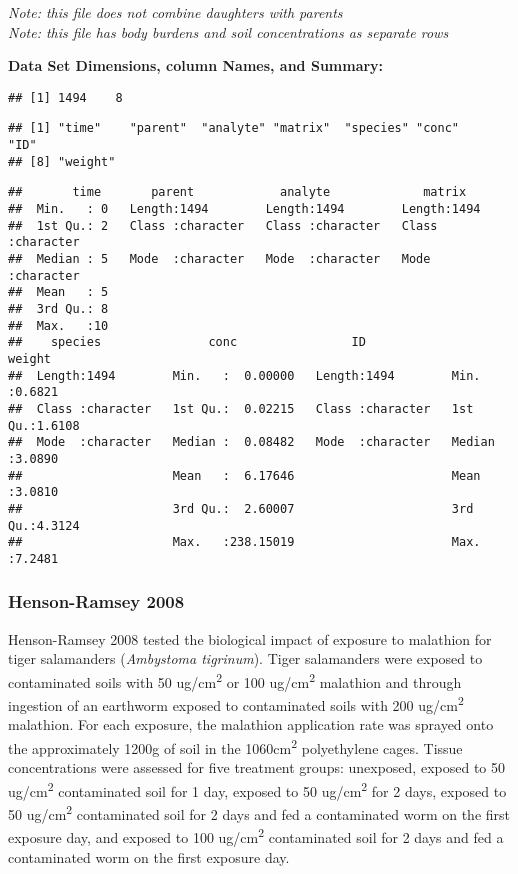 \documentclass[
]{article}
\begin{document}
\emph{Note: this file does not combine daughters with parents}\\
\emph{Note: this file has body burdens and soil concentrations as
separate rows}

\textbf{Data Set Dimensions, column Names, and Summary:}

\begin{verbatim}
## [1] 1494    8
\end{verbatim}

\begin{verbatim}
## [1] "time"    "parent"  "analyte" "matrix"  "species" "conc"    "ID"     
## [8] "weight"
\end{verbatim}

\begin{verbatim}
##       time       parent            analyte             matrix         
##  Min.   : 0   Length:1494        Length:1494        Length:1494       
##  1st Qu.: 2   Class :character   Class :character   Class :character  
##  Median : 5   Mode  :character   Mode  :character   Mode  :character  
##  Mean   : 5                                                           
##  3rd Qu.: 8                                                           
##  Max.   :10                                                           
##    species               conc                ID                weight      
##  Length:1494        Min.   :  0.00000   Length:1494        Min.   :0.6821  
##  Class :character   1st Qu.:  0.02215   Class :character   1st Qu.:1.6108  
##  Mode  :character   Median :  0.08482   Mode  :character   Median :3.0890  
##                     Mean   :  6.17646                      Mean   :3.0810  
##                     3rd Qu.:  2.60007                      3rd Qu.:4.3124  
##                     Max.   :238.15019                      Max.   :7.2481
\end{verbatim}

\hypertarget{henson-ramsey-2008}{%
\subsubsection{Henson-Ramsey 2008}\label{henson-ramsey-2008}}

Henson-Ramsey 2008 tested the biological impact of exposure to malathion
for tiger salamanders (\emph{Ambystoma tigrinum}). Tiger salamanders
were exposed to contaminated soils with 50 ug/cm\textsuperscript{2} or
100 ug/cm\textsuperscript{2} malathion and through ingestion of an
earthworm exposed to contaminated soils with 200
ug/cm\textsuperscript{2} malathion. For each exposure, the malathion
application rate was sprayed onto the approximately 1200g of soil in the
1060cm\textsuperscript{2} polyethylene cages. Tissue concentrations were
assessed for five treatment groups: unexposed, exposed to 50
ug/cm\textsuperscript{2} contaminated soil for 1 day, exposed to 50
ug/cm\textsuperscript{2} for 2 days, exposed to 50
ug/cm\textsuperscript{2} contaminated soil for 2 days and fed a
contaminated worm on the first exposure day, and exposed to 100
ug/cm\textsuperscript{2} contaminated soil for 2 days and fed a
contaminated worm on the first exposure day.
\end{document}

